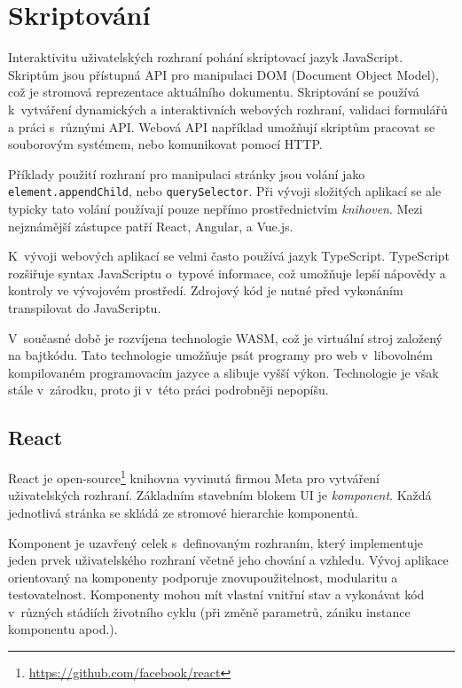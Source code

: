 \section{Skriptování}
\label{ui_scripting}

Interaktivitu uživatelských rozhraní pohání skriptovací jazyk JavaScript.
Skriptům jsou přístupná API pro manipulaci DOM (Document Object Model), což je stromová reprezentace aktuálního dokumentu.
Skriptování se používá k~vytváření dynamických a interaktivních webových rozhraní, validaci formulářů a práci s~různými API.
Webová API například umožňují skriptům pracovat se souborovým systémem, nebo komunikovat pomocí HTTP.

Příklady použití rozhraní pro manipulaci stránky jsou volání jako \texttt{element.\-append\-Child}, nebo \texttt{query\-Selector}.
Při vývoji složitých aplikací se ale typicky tato volání používají pouze nepřímo prostřednictvím \emph{knihoven}.
Mezi nejznámější zástupce patří React, Angular, a Vue.js.

K~vývoji webových aplikací se velmi často používá jazyk TypeScript.
TypeScript rozšiřuje syntax JavaScriptu o~typové informace, což umožňuje lepší nápovědy a kontroly ve vývojovém prostředí.
Zdrojový kód je nutné před vykonáním transpilovat do JavaScriptu.

V~současné době je rozvíjena technologie WASM, což je virtuální stroj založený na bajtkódu.
Tato technologie umožňuje psát programy pro web v~libovolném kompilovaném programovacím jazyce a slibuje vyšší výkon.
Technologie je však stále v~zárodku, proto ji v~této práci podrobněji nepopíšu. 

\subsection{React}

React je open-source\footnote{\href{https://github.com/facebook/react}{https://github.com/facebook/react}} knihovna vyvinutá firmou Meta pro vytváření uživatelských rozhraní.
Základním stavebním blokem UI je \emph{komponent}.
Každá jednotlivá stránka se skládá ze stromové hierarchie komponentů.

Komponent je uzavřený celek s~definovaným rozhraním, který implementuje jeden prvek uživatelského rozhraní včetně jeho chování a vzhledu.
Vývoj aplikace orientovaný na komponenty podporuje znovupoužitelnost, modularitu a testovatelnost.
Komponenty mohou mít vlastní vnitřní stav a vykonávat kód v~různých stádiích životního cyklu (při změně parametrů, zániku instance komponentu apod.).

